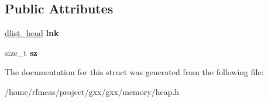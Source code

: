 \subsection*{Public Attributes}
\begin{DoxyCompactItemize}
\item 
\hyperlink{structdlist__head}{dlist\+\_\+head} {\bfseries lnk}\hypertarget{structgxx_1_1memory_1_1freenode_a92f0cfe2deb4e046a6b0cc9b86417f57}{}\label{structgxx_1_1memory_1_1freenode_a92f0cfe2deb4e046a6b0cc9b86417f57}

\item 
size\+\_\+t {\bfseries sz}\hypertarget{structgxx_1_1memory_1_1freenode_a012f190e53666fcfbfc255b1d8173f05}{}\label{structgxx_1_1memory_1_1freenode_a012f190e53666fcfbfc255b1d8173f05}

\end{DoxyCompactItemize}


The documentation for this struct was generated from the following file\+:\begin{DoxyCompactItemize}
\item 
/home/rfmeas/project/gxx/gxx/memory/heap.\+h\end{DoxyCompactItemize}
